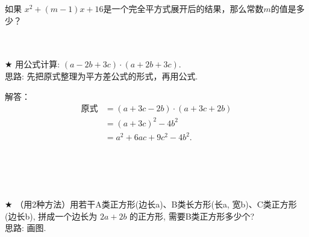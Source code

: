 \item {
    如果 $x^2 + (m-1)x + 16$是一个完全平方式展开后的结果，那么常数$m$的值是多少？ 
    \\ \\ \\
}


\item {
    $\bigstar$
    用公式计算: $(a-2b+3c)\cdot (a+2b+3c)$. 
    \ifshowSolution
    \fangsong{}
    \\
    思路: 先把原式整理为平方差公式的形式，再用公式. 

    解答：
    \begin{align*}
        \mbox{原式} &= (a+3c-2b)\cdot (a+3c+2b) \\
        &= (a+3c)^2 - 4b^2 \\
        &= a^2 + 6ac + 9c^2 - 4b^2. \\
    \end{align*}

    \else
        \\ \\ \\
    \fi
}

\item {
    $\bigstar$
    （用2种方法）用若干A类正方形(边长a)、B类长方形(长a, 宽b)、C类正方形(边长b), 拼成一个边长为 $2a + 2b$ 的正方形, 需要B类正方形多少个? 
    \ifshowSolution
        \fangsong{}
        \\
        思路: 画图. 
    \else
        \\ \\ \\ \\ \\ \\ \\ \\
    \fi
}

